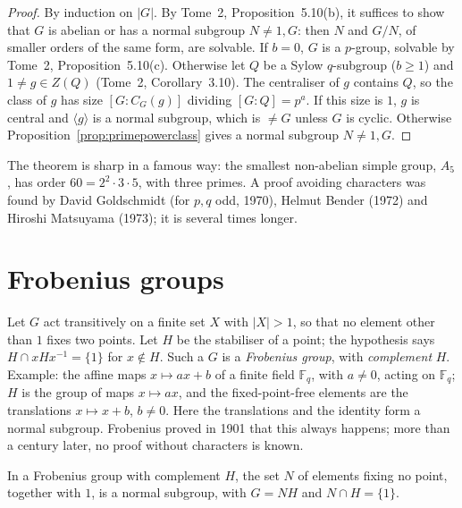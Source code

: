 \begin{proof}
By induction on $|G|$. By Tome~2, Proposition~5.10(b), it suffices to show that $G$ is abelian or has a normal subgroup $N\ne1,G$: then $N$ and $G/N$, of smaller orders of the same form, are solvable. If $b=0$, $G$ is a
$p$-group, solvable by Tome~2, Proposition~5.10(c). Otherwise let $Q$ be a Sylow $q$-subgroup ($b\ge1$) and $1\ne g\in Z(Q)$ (Tome~2, Corollary~3.10). The centraliser of $g$ contains $Q$, so the class of $g$ has size
$[G:C_G(g)]$ dividing $[G:Q]=p^a$. If this size is $1$, $g$ is central and $\langle g\rangle$ is a normal subgroup, which is $\ne G$ unless $G$ is cyclic. Otherwise Proposition~\ref{prop:primepowerclass} gives a normal subgroup
$N\ne1,G$.
\end{proof}

The theorem is sharp in a famous way: the smallest non-abelian simple group, $A_5$, has order $60=2^2\cdot3\cdot5$, with three primes. A proof avoiding characters was found by David Goldschmidt (for $p,q$ odd, 1970), Helmut Bender (1972) and
Hiroshi Matsuyama (1973); it is several times longer.

\section{Frobenius groups}

Let $G$ act transitively on a finite set $X$ with $|X|>1$, so that no element other than $1$ fixes two points. Let $H$ be the stabiliser of a point; the hypothesis says $H\cap xHx^{-1}=\{1\}$ for $x\notin H$. Such a $G$ is a
\emph{Frobenius group}, with \emph{complement} $H$. Example: the affine maps $x\mapsto ax+b$ of a finite field $\mathbb F_q$, with $a\ne0$, acting on $\mathbb F_q$; $H$ is the group of maps $x\mapsto ax$, and the fixed-point-free elements are the
translations $x\mapsto x+b$, $b\ne0$. Here the translations and the identity form a normal subgroup. Frobenius proved in 1901 that this always happens; more than a century later, no proof without characters is known.

\begin{theorem}[Frobenius, 1901]\label{thm:frobeniuskernel}
In a Frobenius group with complement $H$, the set $N$ of elements fixing no point, together with $1$, is a normal subgroup, with $G=NH$ and $N\cap H=\{1\}$.
\end{theorem}

